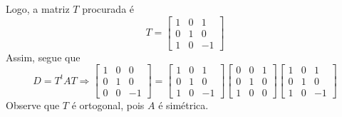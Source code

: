 \documentclass[11pt,a4paper]{article}
\begin{document}
{{\begin{itemize}
\end{itemize}
Logo, a matriz $T$ procurada é 
\[
T = \begin{bmatrix}
1 & 0 & 1 \\
0 & 1 & 0 \\
1 & 0 & -1
\end{bmatrix}
\]
Assim, segue que
\[
D = T^tAT \Rightarrow \begin{bmatrix}
1 & 0 & 0 \\
0 &  1 & 0\\
0 & 0 & -1
\end{bmatrix} = \begin{bmatrix}
1 & 0 & 1 \\
0 & 1 & 0 \\
1 & 0 & -1
\end{bmatrix}\begin{bmatrix}
0 & 0 & 1 \\
0 & 1 & 0 \\
1 & 0 & 0
\end{bmatrix}\begin{bmatrix}
1 & 0 & 1 \\
0 & 1 & 0 \\
1 & 0 & -1
\end{bmatrix}
\]
Observe que $T$ é ortogonal, pois $A$ é simétrica.
}
}
\end{document}
